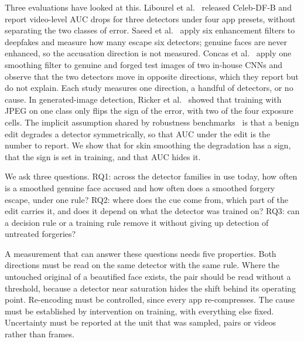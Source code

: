 \documentclass[conference]{IEEEtran}
\begin{document}
Three evaluations have looked at this. Libourel et al.~\cite{libourel2024} released Celeb-DF-B and report video-level AUC
drops for three detectors under four app presets, without separating the two classes of error. Saeed et al.~\cite{saeed2025}
apply six enhancement filters to deepfakes and measure how many escape six detectors; genuine faces are never enhanced, so
the accusation direction is not measured. Concas et al.~\cite{concas2025} apply one smoothing filter to genuine and forged
test images of two in-house CNNs and observe that the two detectors move in opposite directions, which they report but do
not explain. Each study measures one direction, a handful of detectors, or no cause. In generated-image detection, Ricker et
al.~\cite{ricker2026biasid} showed that training with JPEG on one class only flips the sign of the error, with two of the
four exposure cells. The implicit assumption shared by robustness benchmarks~\cite{deeperforensics2020,moire2025,hendrycks2019}
is that a benign edit degrades a detector symmetrically, so that AUC under the edit is the number to report. We show that for
skin smoothing the degradation has a sign, that the sign is set in training, and that AUC hides it.

We ask three questions. RQ1: across the detector families in use today, how often is a smoothed genuine face accused and
how often does a smoothed forgery escape, under one rule? RQ2: where does the cue come from, which part of the edit carries
it, and does it depend on what the detector was trained on? RQ3: can a decision rule or a training rule remove it without
giving up detection of untreated forgeries?

A measurement that can answer these questions needs five properties. Both directions must be read on the same detector with
the same rule. Where the untouched original of a beautified face exists, the pair should be read without a threshold, because
a detector near saturation hides the shift behind its operating point. Re-encoding must be controlled, since every app
re-compresses. The cause must be established by intervention on training, with everything else fixed. Uncertainty must be
reported at the unit that was sampled, pairs or videos rather than frames.
\end{document}
